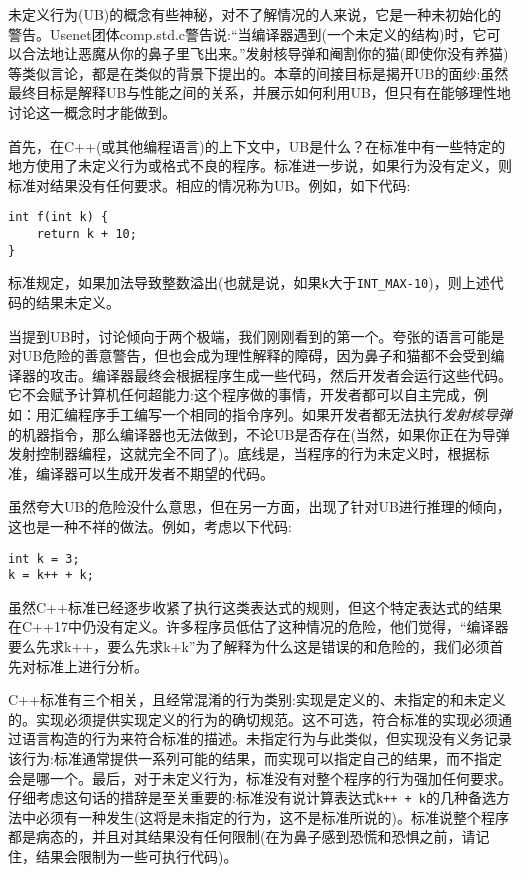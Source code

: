 未定义行为(UB)的概念有些神秘，对不了解情况的人来说，它是一种未初始化的警告。Usenet团体comp.std.c警告说:“当编译器遇到(一个未定义的结构)时，它可以合法地让恶魔从你的鼻子里飞出来。”发射核导弹和阉割你的猫(即使你没有养猫)等类似言论，都是在类似的背景下提出的。本章的间接目标是揭开UB的面纱:虽然最终目标是解释UB与性能之间的关系，并展示如何利用UB，但只有在能够理性地讨论这一概念时才能做到。

首先，在C++(或其他编程语言)的上下文中，UB是什么？在标准中有一些特定的地方使用了未定义行为或格式不良的程序。标准进一步说，如果行为没有定义，则标准对结果没有任何要求。相应的情况称为UB。例如，如下代码:

\begin{lstlisting}[style=styleCXX]
int f(int k) {
	return k + 10;
}
\end{lstlisting}

标准规定，如果加法导致整数溢出(也就是说，如果\texttt{k}大于\texttt{INT\_MAX-10})，则上述代码的结果未定义。

当提到UB时，讨论倾向于两个极端，我们刚刚看到的第一个。夸张的语言可能是对UB危险的善意警告，但也会成为理性解释的障碍，因为鼻子和猫都不会受到编译器的攻击。编译器最终会根据程序生成一些代码，然后开发者会运行这些代码。它不会赋予计算机任何超能力:这个程序做的事情，开发者都可以自主完成，例如：用汇编程序手工编写一个相同的指令序列。如果开发者都无法执行\textit{发射核导弹}的机器指令，那么编译器也无法做到，不论UB是否存在(当然，如果你正在为导弹发射控制器编程，这就完全不同了)。底线是，当程序的行为未定义时，根据标准，编译器可以生成开发者不期望的代码。

虽然夸大UB的危险没什么意思，但在另一方面，出现了针对UB进行推理的倾向，这也是一种不祥的做法。例如，考虑以下代码:

\begin{lstlisting}[style=styleCXX]
int k = 3;
k = k++ + k;
\end{lstlisting}

虽然C++标准已经逐步收紧了执行这类表达式的规则，但这个特定表达式的结果在C++17中仍没有定义。许多程序员低估了这种情况的危险，他们觉得，“编译器要么先求k++，要么先求k+k”为了解释为什么这是错误的和危险的，我们必须首先对标准上进行分析。

C++标准有三个相关，且经常混淆的行为类别:实现是定义的、未指定的和未定义的。实现必须提供实现定义的行为的确切规范。这不可选，符合标准的实现必须通过语言构造的行为来符合标准的描述。未指定行为与此类似，但实现没有义务记录该行为:标准通常提供一系列可能的结果，而实现可以指定自己的结果，而不指定会是哪一个。最后，对于未定义行为，标准没有对整个程序的行为强加任何要求。仔细考虑这句话的措辞是至关重要的:标准没有说计算表达式\texttt{k++ + k}的几种备选方法中必须有一种发生(这将是未指定的行为，这不是标准所说的)。标准说整个程序都是病态的，并且对其结果没有任何限制(在为鼻子感到恐慌和恐惧之前，请记住，结果会限制为一些可执行代码)。

